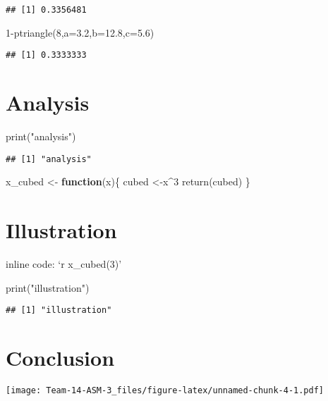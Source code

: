 \documentclass[
]{article}
\newenvironment{Shaded}{\begin{snugshade}}{\end{snugshade}}
\newcommand{\AttributeTok}[1]{\textcolor[rgb]{0.77,0.63,0.00}{#1}}
\newcommand{\ControlFlowTok}[1]{\textcolor[rgb]{0.13,0.29,0.53}{\textbf{#1}}}
\newcommand{\DecValTok}[1]{\textcolor[rgb]{0.00,0.00,0.81}{#1}}
\newcommand{\FloatTok}[1]{\textcolor[rgb]{0.00,0.00,0.81}{#1}}
\newcommand{\FunctionTok}[1]{\textcolor[rgb]{0.00,0.00,0.00}{#1}}
\newcommand{\NormalTok}[1]{#1}
\newcommand{\OtherTok}[1]{\textcolor[rgb]{0.56,0.35,0.01}{#1}}
\newcommand{\SpecialCharTok}[1]{\textcolor[rgb]{0.00,0.00,0.00}{#1}}
\newcommand{\StringTok}[1]{\textcolor[rgb]{0.31,0.60,0.02}{#1}}
\begin{document}
\begin{verbatim}
## [1] 0.3356481
\end{verbatim}

\begin{Shaded}
\begin{Highlighting}[]
\DecValTok{1}\SpecialCharTok{{-}}\FunctionTok{ptriangle}\NormalTok{(}\DecValTok{8}\NormalTok{,}\AttributeTok{a=}\FloatTok{3.2}\NormalTok{,}\AttributeTok{b=}\FloatTok{12.8}\NormalTok{,}\AttributeTok{c=}\FloatTok{5.6}\NormalTok{)}
\end{Highlighting}
\end{Shaded}

\begin{verbatim}
## [1] 0.3333333
\end{verbatim}

\hypertarget{analysis}{%
\section{Analysis}\label{analysis}}

\begin{Shaded}
\begin{Highlighting}[]
\FunctionTok{print}\NormalTok{(}\StringTok{"analysis"}\NormalTok{)}
\end{Highlighting}
\end{Shaded}

\begin{verbatim}
## [1] "analysis"
\end{verbatim}

\begin{Shaded}
\begin{Highlighting}[]
\NormalTok{x\_cubed }\OtherTok{\textless{}{-}} \ControlFlowTok{function}\NormalTok{(x)\{}
\NormalTok{  cubed }\OtherTok{\textless{}{-}}\NormalTok{x}\SpecialCharTok{\^{}}\DecValTok{3}
  \FunctionTok{return}\NormalTok{(cubed)}
\NormalTok{\}}
\end{Highlighting}
\end{Shaded}

\hypertarget{illustration}{%
\section{Illustration}\label{illustration}}

inline code: `r x\_cubed(3)'

\begin{Shaded}
\begin{Highlighting}[]
\FunctionTok{print}\NormalTok{(}\StringTok{"illustration"}\NormalTok{)}
\end{Highlighting}
\end{Shaded}

\begin{verbatim}
## [1] "illustration"
\end{verbatim}

\hypertarget{conclusion}{%
\section{Conclusion}\label{conclusion}}

\texttt{[image: Team-14-ASM-3\_files/figure-latex/unnamed-chunk-4-1.pdf]}
\end{document}
